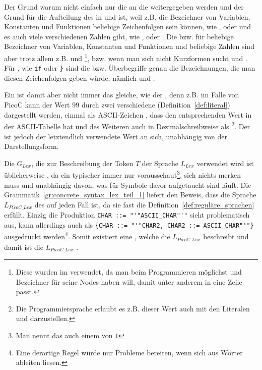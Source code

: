 Der Grund warum nicht einfach nur die  an die  weitergegeben werden und der Grund für die Aufteilung des  in  und  ist, weil z.B. die Bezeichner von Variablen, Konstanten und Funktionen beliebige Zeichenfolgen sein können, wie ,  oder  und es auch viele verschiedenen Zahlen gibt, wie ,  oder . Die  bzw.  für beliebige Bezeichner von Variablen, Konstanten und Funktionen und beliebige Zahlen sind aber trotz allem z.B.  und \footnote{Diese  wurden im   verwendet, da man beim Programmieren möglichst  und  Bezeichner für seine Nodes haben will, damit unter anderem  in eine Zeile passt.}, bzw. wenn man sich nicht Kurzformen sucht  und . Für , wie \verb|if| oder \verb|}| sind die  bzw. Überbegriffe genau die Bezeichnungen, die man diesen Zeichenfolgen geben würde, nämlich  und .

Ein  ist damit aber nicht immer das gleiche, wie der , denn z.B. im Falle von PicoC kann der Wert $99$ durch zwei verschiedene  (Definition~\ref{def:literal}) dargestellt werden, einmal als ASCII-Zeichen , dass den entsprechenden Wert in der ASCII-Tabelle hat und des Weiteren auch in Dezimalschreibweise als \footnote{Die Programmiersprache  erlaubt es z.B. dieser Wert auch mit den Literalen  und  darzustellen.}. Der  ist jedoch der letztendlich verwendete Wert an sich, unabhängig von der Darstellungsform.

Die  $G_{Lex}$, die zur Beschreibung der Token $T$ der Sprache $L_{Lex}$ verwendet wird ist üblicherweise , da ein typischer  immer nur  vorausschaut\footnote{Man nennt das auch einem  von $1$}, sich nichts merken muss und unabhängig davon, was für Symbole davor aufgetaucht sind läuft. Die Grammatik~\ref{gr:concrete_syntax_lex_teil_1} liefert den Beweis, dass die Sprache $L_{PicoC\_Lex}$ des  auf jeden Fall  ist, da sie fast die Definition~\ref{def:reguläre_sprachen} erfüllt. Einzig die Produktion \verb|CHAR ::= "'"ASCII_CHAR"'"| sieht problematisch aus, kann allerdings auch als \verb|{CHAR ::= "'"CHAR2, CHAR2 ::= ASCII_CHAR"'"}|  ausgedrückt werden\footnote{Eine derartige Regel würde nur Probleme bereiten, wenn sich aus   Wörter ableiten liesen.}. Somit existiert eine , welche die  $L_{PicoC\_Lex}$ beschreibt und damit ist die  $L_{PicoC\_Lex}$ .

